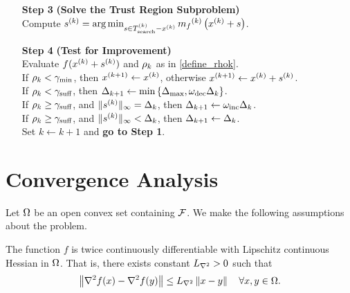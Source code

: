 \documentclass{article}
\begin{document}
{\begin{fullwidth}[leftmargin=0in, rightmargin=0in, width=\linewidth-0.5in]
\begin{flushleft}
\begin{algorithm}[H]
\begin{itemize}
        
        \item[\textbf{Step 3}] \textbf{(Solve the Trust Region Subproblem)} \\
            Compute ${{s}^{(k)}} = \operatorname*{arg\,min}_{s \in {T_{\text{search}}^{(k)}} - x^{(k)}} {{m}_f}^{(k)}\left(x^{(k)} + s\right)$. 
            
 		
        \item[\textbf{Step 4}] \textbf{(Test for Improvement)} \\
            Evaluate $f(x^{(k)} + {{s}^{(k)}})$ and $\rho_k$ as in \cref{define_rhok}. \\
		   If $\rho_k < \gamma_{\textrm{min}}$, then ${{x}^{(k+1)}} \gets x^{(k)}$, otherwise ${{x}^{(k+1)}} \gets x^{(k)} + {{s}^{(k)}}$. \\
            If $\rho_k < \gamma_{\textrm{suff}}$, then $\Delta_{k+1} \gets \min\left\{{\Delta_{\textrm{max}}}, \omega_{\text{dec}}\Delta_k\right\}$. \\
            If $\rho_k \ge \gamma_{\textrm{suff}}$, and $\|{{s}^{(k)}}\|_{\infty} = \Delta_k$, then $\Delta_{k+1} \gets \omega_{\text{inc}}\Delta_k$. \\
            If $\rho_k \ge \gamma_{\textrm{suff}}$, and $\|{{s}^{(k)}}\|_{\infty} < \Delta_k$, then $\Delta_{k+1} \gets \Delta_k$. \\
            Set $k \gets k+1$ and {\bf go to Step 1}.
    \end{itemize}
\end{algorithm}

\end{flushleft}
\end{fullwidth}
}
 
 
\section{Convergence Analysis}
\label{linear_convergence_discussion} 

Let $\Omega$ be an open convex set containing ${\mathcal F}$. 
We make the following assumptions about the problem.


\begin{assumption}
\label{for_fully_quadratic}
\label{lipschitz_hessian}
The function $f$ is twice continuously differentiable with Lipschitz continuous Hessian in $\Omega$.   That is, there exists constant ${L_{\nabla^2}} > 0$ such that 
\begin{align}
\left\|\nabla^2 f(x) - \nabla^2 f(y)\right\| \le {L_{\nabla^2}} \left\|x - y\right\| \quad \forall x, y \in \Omega.
\end{align}
\end{assumption}
\end{document}
